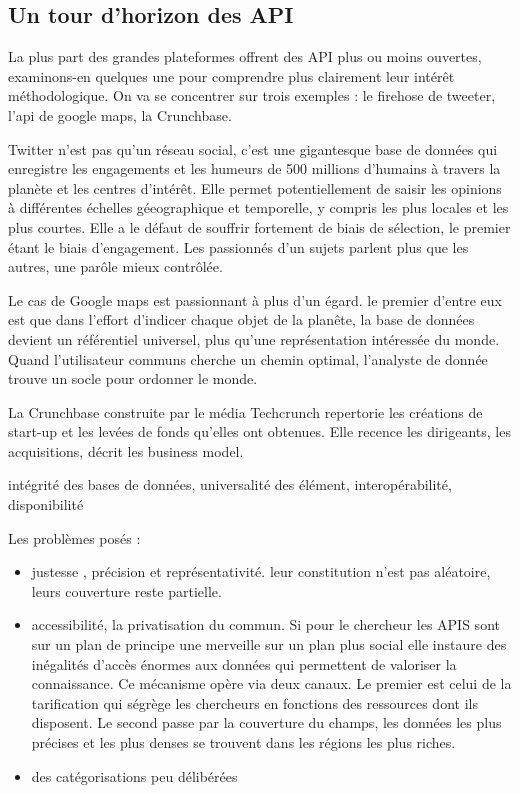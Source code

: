 \documentclass[
]{book}
\providecommand{\tightlist}{%
  \setlength{\itemsep}{0pt}\setlength{\parskip}{0pt}}
\begin{document}
\hypertarget{un-tour-dhorizon-des-api}{%
\subsection{Un tour d'horizon des API}\label{un-tour-dhorizon-des-api}}

La plus part des grandes plateformes offrent des API plus ou moins ouvertes, examinons-en quelques une pour comprendre plus clairement leur intérêt méthodologique. On va se concentrer sur trois exemples : le firehose de tweeter, l'api de google maps, la Crunchbase.

Twitter n'est pas qu'un réseau social, c'est une gigantesque base de données qui enregistre les engagements et les humeurs de 500 millions d'humains à travers la planète et les centres d'intérêt. Elle permet potentiellement de saisir les opinions à différentes échelles géeographique et temporelle, y compris les plus locales et les plus courtes. Elle a le défaut de souffrir fortement de biais de sélection, le premier étant le biais d'engagement. Les passionnés d'un sujets parlent plus que les autres, une parôle mieux contrôlée.

Le cas de Google maps est passionnant à plus d'un égard. le premier d'entre eux est que dans l'effort d'indicer chaque objet de la planête, la base de données devient un référentiel universel, plus qu'une représentation intéressée du monde. Quand l'utilisateur communs cherche un chemin optimal, l'analyste de donnée trouve un socle pour ordonner le monde.

La Crunchbase construite par le média Techcrunch repertorie les créations de start-up et les levées de fonds qu'elles ont obtenues. Elle recence les dirigeants, les acquisitions, décrit les business model.

intégrité des bases de données, universalité des élément, interopérabilité, disponibilité

Les problèmes posés :

\begin{itemize}
\tightlist
\item
  justesse , précision et représentativité. leur constitution n'est pas aléatoire, leurs couverture reste partielle.
\item
  accessibilité, la privatisation du commun. Si pour le chercheur les APIS sont sur un plan de principe une merveille sur un plan plus social elle instaure des inégalités d'accès énormes aux données qui permettent de valoriser la connaissance. Ce mécanisme opère via deux canaux. Le premier est celui de la tarification qui ségrège les chercheurs en fonctions des ressources dont ils disposent. Le second passe par la couverture du champs, les données les plus précises et les plus denses se trouvent dans les régions les plus riches.
\item
  des catégorisations peu délibérées
\end{itemize}
\end{document}
